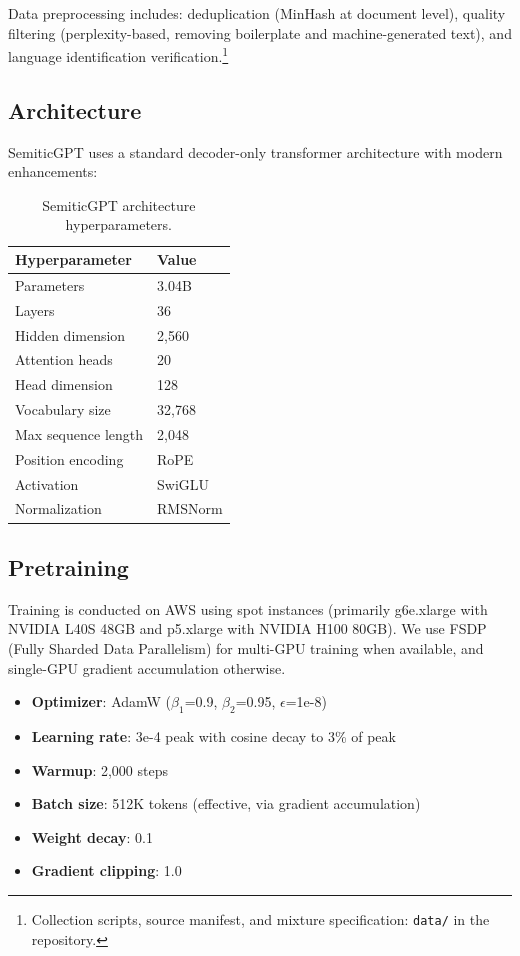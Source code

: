 \documentclass[10pt,twocolumn]{article}
\begin{document}
Data preprocessing includes: deduplication (MinHash at document level), quality filtering (perplexity-based, removing boilerplate and machine-generated text), and language identification verification.\footnote{Collection scripts, source manifest, and mixture specification: \texttt{data/} in the repository.}

\subsection{Architecture}

SemiticGPT uses a standard decoder-only transformer architecture with modern enhancements:

\begin{table}[H]
\centering\small
\begin{tabular}{ll}
\toprule
\textbf{Hyperparameter} & \textbf{Value} \\
\midrule
Parameters & 3.04B \\
Layers & 36 \\
Hidden dimension & 2,560 \\
Attention heads & 20 \\
Head dimension & 128 \\
Vocabulary size & 32,768 \\
Max sequence length & 2,048 \\
Position encoding & RoPE \\
Activation & SwiGLU \\
Normalization & RMSNorm \\
\bottomrule
\end{tabular}
\caption{SemiticGPT architecture hyperparameters.}
\label{tab:architecture}
\end{table}

\subsection{Pretraining}

Training is conducted on AWS using spot instances (primarily g6e.xlarge with NVIDIA L40S 48GB and p5.xlarge with NVIDIA H100 80GB). We use FSDP (Fully Sharded Data Parallelism) for multi-GPU training when available, and single-GPU gradient accumulation otherwise.

\begin{itemize}
    \item \textbf{Optimizer}: AdamW ($\beta_1$=0.9, $\beta_2$=0.95, $\epsilon$=1e-8)
    \item \textbf{Learning rate}: 3e-4 peak with cosine decay to 3\% of peak
    \item \textbf{Warmup}: 2,000 steps
    \item \textbf{Batch size}: 512K tokens (effective, via gradient accumulation)
    \item \textbf{Weight decay}: 0.1
    \item \textbf{Gradient clipping}: 1.0
\end{itemize}
\end{document}
